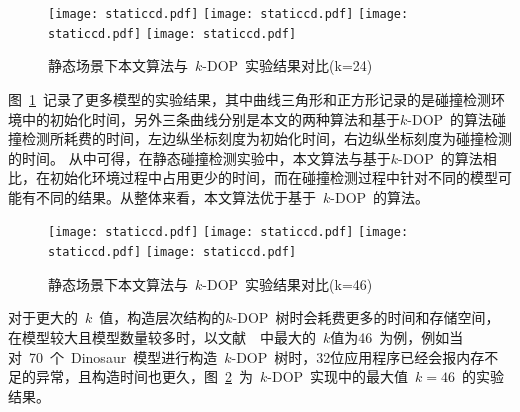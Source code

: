 \begin{figure}[H] 
\centering
{}
{  
   \texttt{[image: staticcd.pdf]}
}
{  
    \texttt{[image: staticcd.pdf]}
}\linebreak %
{  
   \texttt{[image: staticcd.pdf]}
}
{  
   \texttt{[image: staticcd.pdf]}
}
\caption{静态场景下本文算法与~$k$-DOP~实验结果对比(k=24)}
\label{fig:chart:exps:kdop:kcbp:k24}
\end{figure}

图~\ref{fig:chart:exps:kdop:kcbp:k24}~记录了更多模型的实验结果，其中曲线三角形和正方形记录的是碰撞检测环境中的初始化时间，另外三条曲线分别是本文的两种算法和基于$k$-DOP~的算法碰撞检测所耗费的时间，左边纵坐标刻度为初始化时间，右边纵坐标刻度为碰撞检测的时间。
从中可得，在静态碰撞检测实验中，本文算法与基于$k$-DOP~的算法相比，在初始化环境过程中占用更少的时间，而在碰撞检测过程中针对不同的模型可能有不同的结果。从整体来看，本文算法优于基于~$k$-DOP~的算法。

\begin{figure}[H] 
\centering
{}
{  
   \texttt{[image: staticcd.pdf]}
}
{  
    \texttt{[image: staticcd.pdf]}
}\linebreak %
{  
   \texttt{[image: staticcd.pdf]}
}
{  
   \texttt{[image: staticcd.pdf]}
}
\caption{静态场景下本文算法与~$k$-DOP~实验结果对比(k=46)}
\label{fig:chart:exps:kdop:kcbp:k46}
\end{figure}

对于更大的~$k$~值，构造层次结构的$k$-DOP~树时会耗费更多的时间和存储空间，在模型较大且模型数量较多时，以文献~~中最大的~$k$值为46~为例，例如当对~70~个~Dinosaur~模型进行构造~$k$-DOP~树时，32位应用程序已经会报内存不足的异常，且构造时间也更久，图~\ref{fig:chart:exps:kdop:kcbp:k46}~为~$k$-DOP~实现中的最大值~$k=46$~的实验结果。


